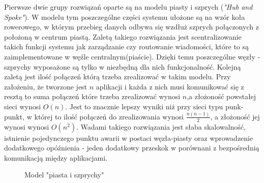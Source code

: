 Pierwsze dwie grupy rozwiązań oparte są na modelu piasty i szprych (\textit{"Hub and Spoke"}). W modelu tym poszczególne części systemu ułożone są na wzór koła rowerowego, w którym przebieg danych odbywa się wzdłuż szprych połączonych z położoną w centrum piastą. Zaletą takiego rozwiązania jest scentralizowanie takich funkcji systemu jak zarządzanie czy routowanie wiadomości,  które to są zaimplementowane w węźle centralnym(piaście). Dzięki temu poszczególne węzły - szprychy wyposażone są tylko w niezbędną dla nich funkcjonalność. Kolejną zaletą jest ilość połączeń którą trzeba zrealizować w takim modelu. Przy założeniu, że tworzone jest \begin{math}n\end{math} aplikacji i każda z nich musi komunikować się z resztą to suma połączeń które trzeba zrealizować wynosi \begin{math}n\end{math},a złożoność powstałej sieci wynosi \begin{math}O(n)\end{math}. Jest to znacznie lepszy wyniki niż przy sieci typu punk-punkt, w której to ilość połączeń do zrealizowania wynosi \begin{math}\frac{n (n- 1)}{2}\end{math}, a złożoność jej wynosi wynosi  \begin{math}O(n^2)\end{math}. Wadami takiego rozwiązania jest słaba skalowalność, istnienie pojedynczego punktu awarii w postaci węzła-piasty oraz wprowadzenie dodatkowego opóźnienia - jeden dodatkowy przeskok w porównani z bezpośrednią komunikacją między aplikacjami.

\setlength\fboxsep{20pt}
\setlength\fboxrule{1pt}
\begin{figure}[!h]
	\centering
	\caption{Model "piasta i szprychy"}\label{fig:hub_and_spoke}
\end{figure}

